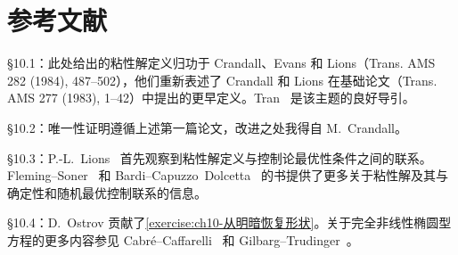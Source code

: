 \documentclass[../../main.tex]{subfiles}
\begin{document}
\section{参考文献}\label{section:ch10-参考文献}

\S10.1：此处给出的粘性解定义归功于 Crandall、Evans 和 Lions（Trans. AMS 282 (1984), 487--502），他们重新表述了 Crandall 和 Lions 在基础论文（Trans. AMS 277 (1983), 1--42）中提出的更早定义。Tran~\cite{Tn} 是该主题的良好导引。

\S10.2：唯一性证明遵循上述第一篇论文，改进之处我得自 M.~Crandall。

\S10.3：P.-L.~Lions~\cite{Li} 首先观察到粘性解定义与控制论最优性条件之间的联系。Fleming--Soner~\cite{F-S} 和 Bardi--Capuzzo~Dolcetta~\cite{B-CD} 的书提供了更多关于粘性解及其与确定性和随机最优控制联系的信息。

\S10.4：D.~Ostrov 贡献了\cref{exercise:ch10-从明暗恢复形状}。关于完全非线性椭圆型方程的更多内容参见 Cabr\'e--Caffarelli~\cite{C-C} 和 Gilbarg--Trudinger~\cite{G-T}。
\end{document}
